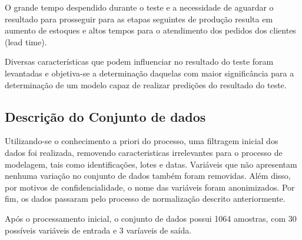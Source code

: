 O grande tempo despendido durante o teste e a necessidade de aguardar o resultado para prosseguir para as etapas seguintes de produção resulta em aumento de estoques e altos tempos para o atendimento dos pedidos dos clientes (lead time).

Diversas características que podem influenciar no resultado do teste foram levantadas e objetiva-se a determinação daquelas com maior significância para a determinação de um modelo capaz de realizar predições do resultado do teste.

\subsection{Descrição do Conjunto de dados}

Utilizando-se o conhecimento a priori do processo, uma filtragem inicial dos dados foi realizada, removendo caracteristicas irrelevantes para o processo de modelagem, tais como identificações, lotes e datas. Variáveis que não apresentam nenhuma variação no conjunto de dados também foram removidas. Além disso, por motivos de confidencialidade, o nome das variáveis foram anonimizados. Por fim, os dados passaram pelo processo de normalização descrito anteriormente.

Após o processamento inicial, o conjunto de dados possui 1064 amostras, com 30 possíveis variáveis de entrada e 3 varíaveis de saída.


